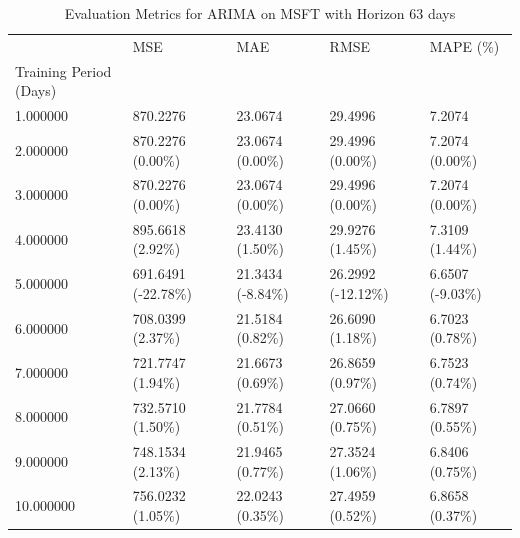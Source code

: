 \begin{table}
\caption{Evaluation Metrics for ARIMA on MSFT with Horizon 63 days}
\label{tab:arima_MSFT_h63_metrics}
\begin{tabular}{lllll}
\toprule
 & MSE & MAE & RMSE & MAPE (\%) \\
Training Period (Days) &  &  &  &  \\
\midrule
1.000000 & 870.2276 & 23.0674 & 29.4996 & 7.2074 \\
2.000000 & 870.2276 (0.00\%) & 23.0674 (0.00\%) & 29.4996 (0.00\%) & 7.2074 (0.00\%) \\
3.000000 & 870.2276 (0.00\%) & 23.0674 (0.00\%) & 29.4996 (0.00\%) & 7.2074 (0.00\%) \\
4.000000 & 895.6618 (2.92\%) & 23.4130 (1.50\%) & 29.9276 (1.45\%) & 7.3109 (1.44\%) \\
5.000000 & 691.6491 (-22.78\%) & 21.3434 (-8.84\%) & 26.2992 (-12.12\%) & 6.6507 (-9.03\%) \\
6.000000 & 708.0399 (2.37\%) & 21.5184 (0.82\%) & 26.6090 (1.18\%) & 6.7023 (0.78\%) \\
7.000000 & 721.7747 (1.94\%) & 21.6673 (0.69\%) & 26.8659 (0.97\%) & 6.7523 (0.74\%) \\
8.000000 & 732.5710 (1.50\%) & 21.7784 (0.51\%) & 27.0660 (0.75\%) & 6.7897 (0.55\%) \\
9.000000 & 748.1534 (2.13\%) & 21.9465 (0.77\%) & 27.3524 (1.06\%) & 6.8406 (0.75\%) \\
10.000000 & 756.0232 (1.05\%) & 22.0243 (0.35\%) & 27.4959 (0.52\%) & 6.8658 (0.37\%) \\
\bottomrule
\end{tabular}
\end{table}
